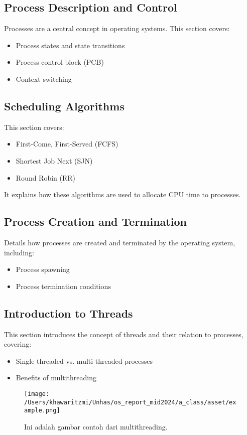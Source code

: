 \documentclass[12pt]{article}
\begin{document}
\begin{itemiz;[e}
\subsection{Process Description and Control}
Processes are a central concept in operating systems. This section covers:
\begin{itemize}
    \item Process states and state transitions
    \item Process control block (PCB)
    \item Context switching
\end{itemize}

\subsection{Scheduling Algorithms}
This section covers:
\begin{itemize}
    \item First-Come, First-Served (FCFS)
    \item Shortest Job Next (SJN)
    \item Round Robin (RR)
\end{itemize}
It explains how these algorithms are used to allocate CPU time to processes.

\subsection{Process Creation and Termination}
Details how processes are created and terminated by the operating system, including:
\begin{itemize}
    \item Process spawning
    \item Process termination conditions
\end{itemize}

\subsection{Introduction to Threads}
This section introduces the concept of threads and their relation to processes, covering:
\begin{itemize}
    \item Single-threaded vs. multi-threaded processes
    \item Benefits of multithreading
\end{itemize}

\begin{figure}[h]
    \centering
    \texttt{[image: /Users/khawaritzmi/Unhas/os\_report\_mid2024/a\_class/asset/example.png]}  %
    \caption{Ini adalah gambar contoh dari multithreading.}
    \label{fig:contoh_gambar}
\end{figure}


\end{itemiz;[e}
\end{document}
